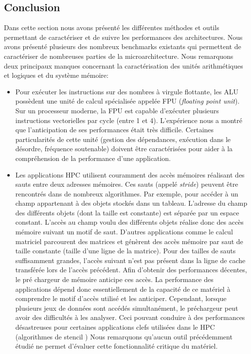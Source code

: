 \subsection{Conclusion} \label{sec:edl_hc_conclusion} \label{sec:edl_perf_conclusion}

    Dans cette section nous avons présenté les différentes méthodes et outils permettant de caractériser et de suivre les performances des architectures.  Nous avons présenté plusieurs des nombreux \glspl{benchmark} existants qui permettent de caractériser de nombreuses parties de la microarchitecture. Nous remarquons deux principaux manques concernant la caractérisation des unités arithmétiques et logiques et du système mémoire:
       \begin{itemize}
           \item Pour exécuter les instructions sur des nombres à virgule flottante, les ALU possèdent une unité de calcul spécialisée appelée FPU (\textit{floating point unit}). Sur un processeur moderne, la FPU est capable d'exécuter plusieurs instructions vectorielles par cycle (entre 1 et 4). L'expérience nous a montré que l'anticipation de ses performances était très difficile. Certaines particularités de cette unité (gestion des dépendances, exécution dans le désordre, fréquence soutenable) doivent être caractérisées pour aider à la compréhension de la performance d'une application. 
           
           \item Les applications \gls{HPC} utilisent couramment des accès mémoires réalisant des sauts entre deux adresses mémoires. Ces sauts (appelé \textit{stride}) peuvent être rencontrés dans de nombreux algorithmes. Par exemple, pour accéder à un champ appartenant à des objets stockés dans un tableau. L'adresse du champ des différents objets (dont la taille est constante) est séparée par un espace constant. L'accès au champ voulu des différents objets réalise donc des accès mémoire suivant un motif de saut. D’autres applications comme le calcul matriciel parcourent des matrices et génèrent des accès mémoire par saut de taille constante (taille d’une ligne de la matrice). Pour des tailles de sauts suffisamment grandes, l'accès suivant n'est pas présent dans la ligne de cache transférée lors de l'accès précédent. Afin d'obtenir des performances décentes, le pré chargeur de mémoire anticipe ces accès. La performance des applications dépend donc essentiellement de la capacité de ce matériel à comprendre le motif d'accès utilisé et les anticiper. Cependant, lorsque plusieurs jeux de données sont accédés simultanément, le préchargeur peut avoir des difficultés à les analyser. Ceci pouvant conduire à des performances désastreuses pour certaines applications clefs utilisées dans le HPC (algorithmes de stencil \cite{datta2008stencil}) Nous remarquons qu'aucun outil précédemment étudié ne permet d'évaluer cette fonctionnalité critique du matériel. 
       \end{itemize}
   
